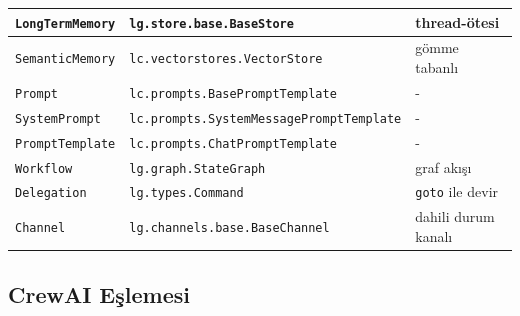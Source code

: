 \documentclass[10pt, a4paper, twocolumn]{article}
\begin{document}
\begin{center}
\begin{tabular}{|p{1.4cm}|p{3.4cm}|p{2.2cm}|}
\hline
\texttt{LongTermMemory} & \texttt{lg.store.base.BaseStore} & thread-ötesi \\
\hline
\texttt{SemanticMemory} & \texttt{lc.vectorstores.VectorStore} & gömme tabanlı \\
\hline
\texttt{Prompt} & \texttt{lc.prompts.BasePromptTemplate} & {-} \\
\hline
\texttt{SystemPrompt} & \texttt{lc.prompts.SystemMessage\-PromptTemplate} & {-} \\
\hline
\texttt{PromptTemplate} & \texttt{lc.prompts.ChatPromptTemplate} & {-} \\
\hline
\texttt{Workflow} & \texttt{lg.graph.StateGraph} & graf akışı \\
\hline
\texttt{Delegation} & \texttt{lg.types.Command} & \texttt{goto} ile devir \\
\hline
\texttt{Channel} & \texttt{lg.channels.base.BaseChannel} & dahili durum kanalı \\
\hline
\end{tabular}
\label{tab:map-langchain}
\end{center}

\subsection*{CrewAI Eşlemesi}
\end{document}
